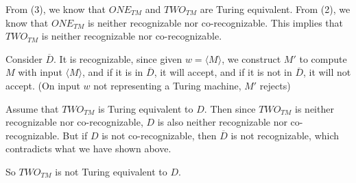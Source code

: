 \documentclass[letterpaper,12pt]{article}
\begin{document}
From (3), we know that $ONE_{TM}$ and $TWO_{TM}$ are Turing equivalent. From (2), we know that $ONE_{TM}$ is neither recognizable nor co-recognizable. This implies that $TWO_{TM}$ is neither recognizable nor co-recognizable.

Consider $\overline{D}$. It is recognizable, since given $w = \langle M \rangle$, we construct $M'$ to compute $M$ with input $\langle M \rangle$, and if it is in $\overline{D}$, it will accept, and if it is not in $\overline{D}$, it will not accept. (On input $w$ not representing a Turing machine, $M'$ rejects)

Assume that $TWO_{TM}$ is Turing equivalent to $D$. Then since $TWO_{TM}$ is neither recognizable nor co-recognizable, $D$ is also neither recognizable nor co-recognizable. But if $D$ is not co-recognizable, then $\overline{D}$ is not recognizable, which contradicts what we have shown above.

So $TWO_{TM}$ is not Turing equivalent to $D$.
\end{document}
